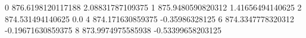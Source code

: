 0 876.6198120117188 2.08831787109375
1 875.9480590820312 1.41656494140625
2 874.531494140625 0.0
4 874.171630859375 -0.35986328125
6 874.3347778320312 -0.19671630859375
8 873.9974975585938 -0.53399658203125
